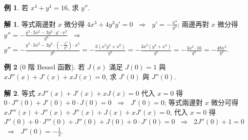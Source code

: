 \documentclass[12pt]{extarticle}
\newcommand{\ds}{\displaystyle}
\newcommand{\ie}{\;\Longrightarrow\;}
\theoremstyle{definition}
\newtheorem*{ex}{例}
\newtheorem*{sol}{解}
\begin{document}
\begin{ex}
  若 $\ds x^4 + y^4 = 16$, 求 $y''$.     
\end{ex}

\begin{sol}
  等式兩邊對 $x$ 微分得 $\ds 4x^3 + 4 y^3 y' = 0$ $\ie$ $\ds y' = -\frac{x^3}{y^3}$; 兩邊再對 $x$ 微分得 $\ds y'' = -\frac{y^3\cdot 3x^2 - 3y^2\cdot y'\cdot x^3}{y^6}$ $\ie$ $\ds y'' = -\frac{y^3\cdot 3x^2 - 3y^2\cdot(-\frac{x^3}{y^3})\cdot x^3}{y^6} = -\frac{3(x^2y^4 + x^6)}{y^7} = -\frac{3x^2(y^4 + x^4)}{y^7} = -\frac{3x^2\cdot 16}{y^7} = -\frac{48x^2}{y^7}$.
\end{sol}

\begin{ex}[$0$ 階 Bessel 函數]
  若 $J(x)$ 滿足 $J(0) = 1$ 與 $\ds xJ''(x) + J'(x) + xJ(x) = 0$, 求 $J'(0)$ 與 $J''(0)$.     
\end{ex}

\begin{sol}
  等式 $\ds xJ''(x) + J'(x) + xJ(x) = 0$ 代入 $x = 0$ 得 $0\cdot J''(0) + J'(0) + 0\cdot J(0) = 0$ $\ie$ $J'(0) = 0$; 等式兩邊對 $x$ 微分可得 $\ds xJ'''(x) + J''(x) + J''(x) + J(x) + xJ'(x) = 0$, 代入 $x = 0$ 得 $J''(0) + 0\cdot J'''(0) + J''(0) + J(0) + 0\cdot J'(0) = 0$ $\ie$ $2 J''(0) + 1 = 0$ $\ie$ $J''(0) = -\frac{1}{2}$. 
\end{sol}
\end{document}
